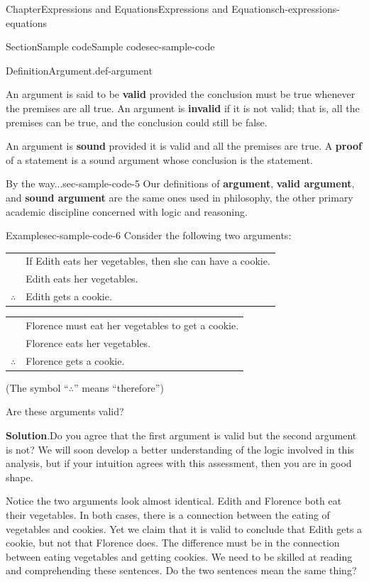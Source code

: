 \documentclass[twoside,11pt,]{book}
\newcommand{\blocktitlefont}{\relax}
\newcommand{\tabularfont}{\relax}
\newcommand{\terminology}[1]{\textbf{#1}}
\numberwithin{equation}{chapter}
\newcommand{\hrulethin}  {\noalign{\hrule height 0.04em}}
\begin{document}
\begin{chapterptx}{Chapter}{Expressions and Equations}{}{Expressions and Equations}{}{}{ch-expressions-equations}
\begin{sectionptx}{Section}{Sample code}{}{Sample code}{}{}{sec-sample-code}
\begin{definition}{Definition}{Argument.}{def-argument}
\par
An argument is said to be \terminology{valid}  provided the conclusion must be true whenever the premises are all true. An argument is \terminology{invalid} if it is not valid; that is, all the premises can be true, and the conclusion could still be false.%
\par
An argument is \terminology{sound} provided it is valid and all the premises are true. A \terminology{proof} of a statement is a sound argument whose conclusion is the statement.%
\end{definition}
\begin{aside}{By the way...}{}{sec-sample-code-5}%
Our definitions of \terminology{argument}, \terminology{valid argument}, and \terminology{sound argument} are the same ones used in philosophy, the other primary academic discipline concerned with logic and reasoning.%
\end{aside}
\begin{example}{Example}{}{sec-sample-code-6}%
Consider the following two arguments:%
\begin{center}%
{\tabularfont%
\begin{tabular}{ll}
&If Edith eats her vegetables, then she can have a cookie.\tabularnewline[0pt]
&Edith eats her vegetables.\tabularnewline\hrulethin
\(\therefore\)&Edith gets a cookie.
\end{tabular}
}%
\end{center}%
\begin{center}%
{\tabularfont%
\begin{tabular}{ll}
&Florence must eat her vegetables to get a cookie.\tabularnewline[0pt]
&Florence eats her vegetables.\tabularnewline\hrulethin
\(\therefore\)&Florence gets a cookie.
\end{tabular}
}%
\end{center}%
(The symbol ``\(\therefore\)'' \label{sec-sample-code-6-2-4-2} means ``therefore'')%
\par
Are these arguments valid?%
\par\smallskip%
\noindent\textbf{\blocktitlefont Solution}.\hypertarget{sec-sample-code-6-3}{}\quad{}Do you agree that the first argument is valid but the second argument is not? We will soon develop a better understanding of the logic involved in this analysis, but if your intuition agrees with this assessment, then you are in good shape.%
\par
Notice the two arguments look almost identical. Edith and Florence both eat their vegetables. In both cases, there is a connection between the eating of vegetables and cookies. Yet we claim that it is valid to conclude that Edith gets a cookie, but not that Florence does. The difference must be in the connection between eating vegetables and getting cookies. We need to be skilled at reading and comprehending these sentences. Do the two sentences mean the same thing?%

\end{example}
\end{sectionptx}
\end{chapterptx}
\end{document}
